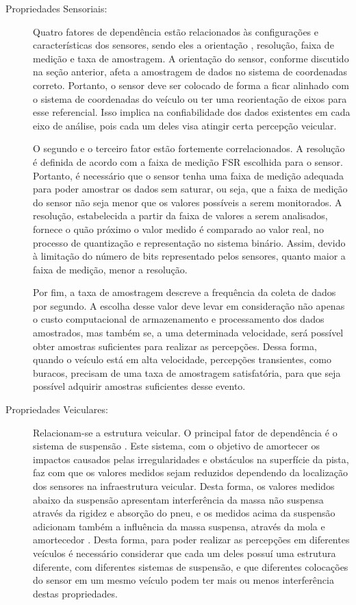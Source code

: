 \begin{description}
	
	\item [Propriedades Sensoriais:] 
	
	Quatro fatores de dependência estão relacionados às configurações e características dos sensores, sendo eles a orientação \cite{Kumar2017,Alam2020}, resolução, faixa de medição e taxa de amostragem. A orientação do sensor, conforme discutido na seção anterior, afeta a amostragem de dados no sistema de coordenadas correto. Portanto, o sensor deve ser colocado de forma a ficar alinhado com o sistema de coordenadas do veículo ou ter uma reorientação de eixos para esse referencial. Isso implica na confiabilidade dos dados existentes em cada eixo de análise, pois cada um deles visa atingir certa percepção veicular.

	O segundo e o terceiro fator estão fortemente correlacionados. A resolução é definida de acordo com a faixa de medição FSR escolhida para o sensor. Portanto, é necessário que o sensor tenha uma faixa de medição adequada para poder amostrar os dados sem saturar, ou seja, que a faixa de medição do sensor não seja menor que os valores possíveis a serem monitorados. A resolução, estabelecida a partir da faixa de valores a serem analisados, fornece o quão próximo o valor medido é comparado ao valor real, no processo de quantização e representação no sistema binário. Assim, devido à limitação do número de bits representado pelos sensores, quanto maior a faixa de medição, menor a resolução.
	
	Por fim, a taxa de amostragem descreve a frequência da coleta de dados por segundo. A escolha desse valor deve levar em consideração não apenas o custo computacional de armazenamento e processamento dos dados amostrados, mas também se, a uma determinada velocidade, será possível obter amostras suficientes para realizar as percepções. Dessa forma, quando o veículo está em alta velocidade, percepções transientes, como buracos, precisam de uma taxa de amostragem satisfatória, para que seja possível adquirir amostras suficientes desse evento.
	
	\item [Propriedades Veiculares:] 
	
	Relacionam-se a estrutura veicular. O principal fator de dependência é o sistema de suspensão \cite{Kumar2017, Wickramarathne2018,Alam2020}. Este sistema, com o objetivo de amortecer os impactos causados pelas irregularidades e obstáculos na superfície da pista, faz com que os valores medidos sejam reduzidos dependendo da localização dos sensores na infraestrutura veicular. Desta forma, os valores medidos abaixo da suspensão apresentam interferência da massa não suspensa através da rigidez e absorção do pneu, e os medidos acima da suspensão adicionam também a influência da massa suspensa, através da mola e amortecedor \cite{Yafeai2019}. Desta forma, para poder realizar as percepções em diferentes veículos é necessário considerar que cada um deles possuí uma estrutura diferente, com diferentes sistemas de suspensão, e que diferentes colocações do sensor em um mesmo veículo podem ter mais ou menos interferência destas propriedades.


\end{description}
